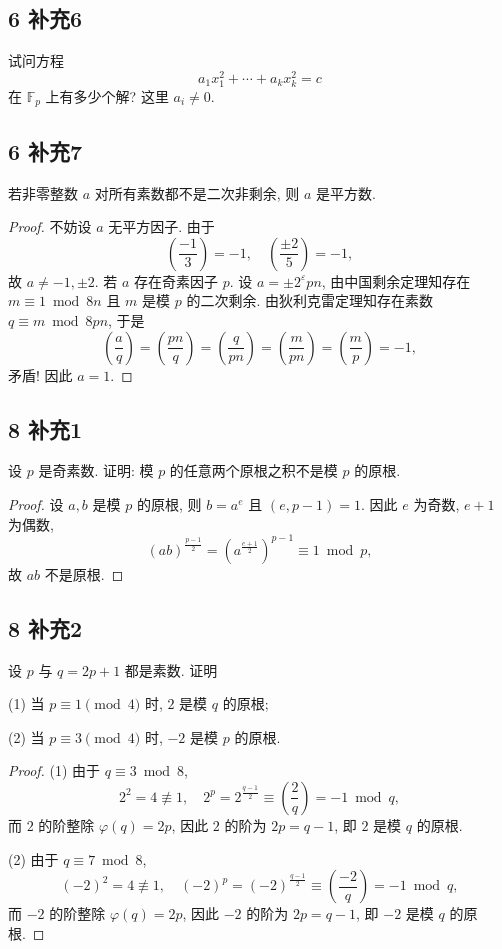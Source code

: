 \documentclass[12pt,a4paper,reqno]{amsart}
\theoremstyle{remark}
\newcommand{\F}{\mathbb{F}}
\newcommand{\leg}[2]{\left(\frac{#1}{#2}\right)}    %
\begin{document}
\subsection*{6 补充6}
试问方程
  \[a_1x_1^2+\cdots+a_kx_k^2=c\]
在 $\F_p$ 上有多少个解? 这里 $a_i\neq 0$.

\subsection*{6 补充7}
若非零整数 $a$ 对所有素数都不是二次非剩余, 则 $a$ 是平方数.
\begin{proof}
不妨设 $a$ 无平方因子. 由于
  \[\leg{-1}{3}=-1,\quad \leg{\pm2}{5}=-1,\]
故 $a\neq -1,\pm2$. 若 $a$ 存在奇素因子 $p$. 设 $a=\pm 2^\varepsilon pn$, 由中国剩余定理知存在 $m\equiv 1\bmod{8n}$ 且 $m$ 是模 $p$ 的二次剩余. 由狄利克雷定理知存在素数 $q\equiv m\bmod{8pn}$, 于是
  \[\leg{a}{q}=\leg{pn}{q}=\leg{q}{pn}=\leg{m}{pn}=\leg{m}{p}=-1,\]
矛盾! 因此 $a=1$.
\end{proof}

\subsection*{8 补充1}
设 $p$ 是奇素数. 证明: 模 $p$ 的任意两个原根之积不是模 $p$ 的原根.
\begin{proof}
设 $a,b$ 是模 $p$ 的原根, 则 $b=a^e$ 且 $(e,p-1)=1$. 因此 $e$ 为奇数, $e+1$ 为偶数,
  \[(ab)^{\frac{p-1}{2}}=(a^{\frac{e+1}{2}})^{p-1}\equiv 1\bmod p,\]
故 $ab$ 不是原根.
\end{proof}

\subsection*{8 补充2}
设 $p$ 与 $q=2p+1$ 都是素数. 证明

(1) 当 $p\equiv1\pmod4$ 时, $2$ 是模 $q$ 的原根;

(2) 当 $p\equiv3\pmod 4$ 时, $-2$ 是模 $p$ 的原根.

\begin{proof}
(1) 由于 $q\equiv 3\bmod 8$,
  \[2^2=4\not\equiv 1,\quad 2^p=2^{\frac{q-1}{2}}\equiv\leg{2}{q}=-1\bmod q,\]
而 $2$ 的阶整除 $\varphi(q)=2p$, 因此 $2$ 的阶为 $2p=q-1$, 即 $2$ 是模 $q$ 的原根.

(2) 由于 $q\equiv 7\bmod 8$,
  \[(-2)^2=4\not\equiv 1,\quad (-2)^p=(-2)^{\frac{q-1}{2}}\equiv\leg{-2}{q}=-1\bmod q,\]
而 $-2$ 的阶整除 $\varphi(q)=2p$, 因此 $-2$ 的阶为 $2p=q-1$, 即 $-2$ 是模 $q$ 的原根.
\end{proof}
\end{document}
